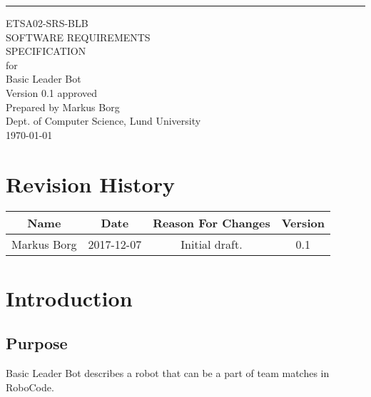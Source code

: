 \documentclass{scrreprt}
\date{}
\def\myversion{0.1 }
\begin{document}
\begin{flushright}
    \rule{16cm}{5pt}\vskip1cm
    \begin{bfseries}
    	\LARGE{ETSA02-SRS-BLB}\\
    	\vspace{1.5cm}
        \Huge{SOFTWARE REQUIREMENTS\\ SPECIFICATION}\\
        \vspace{0.5cm}
        for\\
        \vspace{0.5cm}
        Basic Leader Bot\\
        \vspace{1.5cm}
        \LARGE{Version \myversion approved}\\
        \vspace{1.5cm}
        Prepared by Markus Borg\\
        Dept. of Computer Science, Lund University\\
        \vspace{1.5cm}
        \today\\
    \end{bfseries}
\end{flushright}

\tableofcontents


\chapter*{Revision History}

\begin{center}
    \begin{tabular}{|c|c|c|c|}
        \hline
	    Name & Date & Reason For Changes & Version\\
        \hline
	    Markus Borg & 2017-12-07 & Initial draft. & 0.1\\
        \hline
    \end{tabular}
\end{center}

\chapter{Introduction}

\section{Purpose}
Basic Leader Bot describes a robot that can be a part of team matches in RoboCode.\\\\
\end{document}
